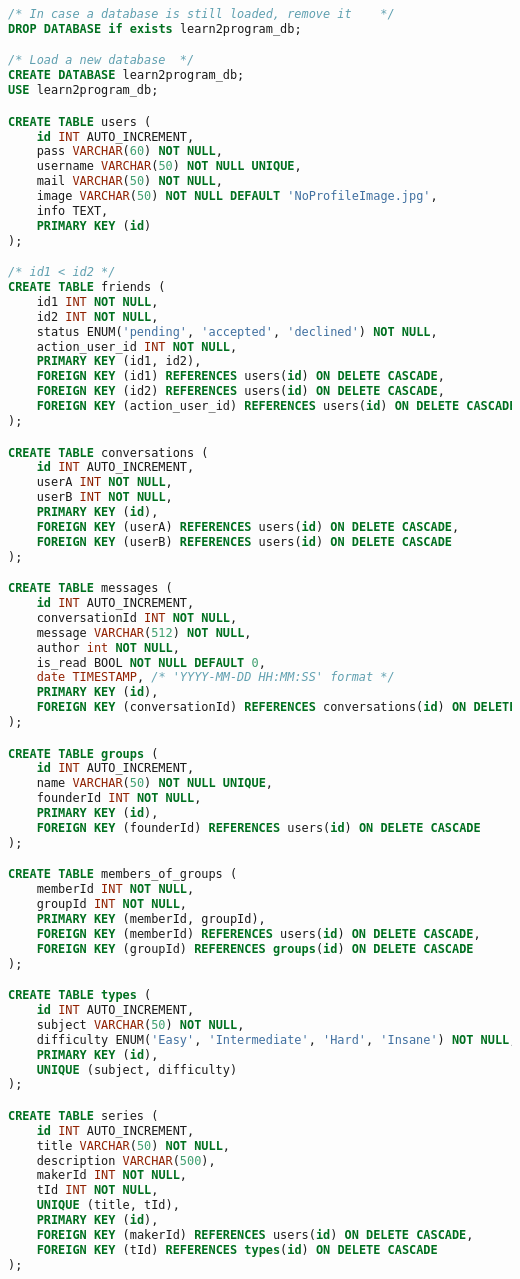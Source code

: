 \begin{lstlisting}[language=sql]
/* In case a database is still loaded, remove it    */
DROP DATABASE if exists learn2program_db;

/* Load a new database  */
CREATE DATABASE learn2program_db;
USE learn2program_db;

CREATE TABLE users (
    id INT AUTO_INCREMENT,
    pass VARCHAR(60) NOT NULL,
    username VARCHAR(50) NOT NULL UNIQUE,
    mail VARCHAR(50) NOT NULL,
    image VARCHAR(50) NOT NULL DEFAULT 'NoProfileImage.jpg', 
    info TEXT,
    PRIMARY KEY (id)
);

/* id1 < id2 */
CREATE TABLE friends (
    id1 INT NOT NULL,
    id2 INT NOT NULL,
    status ENUM('pending', 'accepted', 'declined') NOT NULL,
    action_user_id INT NOT NULL,
    PRIMARY KEY (id1, id2),
    FOREIGN KEY (id1) REFERENCES users(id) ON DELETE CASCADE,
    FOREIGN KEY (id2) REFERENCES users(id) ON DELETE CASCADE,
    FOREIGN KEY (action_user_id) REFERENCES users(id) ON DELETE CASCADE
);

CREATE TABLE conversations (
    id INT AUTO_INCREMENT,
    userA INT NOT NULL,
    userB INT NOT NULL,
    PRIMARY KEY (id),
    FOREIGN KEY (userA) REFERENCES users(id) ON DELETE CASCADE,
    FOREIGN KEY (userB) REFERENCES users(id) ON DELETE CASCADE
);

CREATE TABLE messages (
    id INT AUTO_INCREMENT,
    conversationId INT NOT NULL,
    message VARCHAR(512) NOT NULL,
    author int NOT NULL,
    is_read BOOL NOT NULL DEFAULT 0,
    date TIMESTAMP, /* 'YYYY-MM-DD HH:MM:SS' format */
    PRIMARY KEY (id),
    FOREIGN KEY (conversationId) REFERENCES conversations(id) ON DELETE CASCADE
);

CREATE TABLE groups (
    id INT AUTO_INCREMENT,
    name VARCHAR(50) NOT NULL UNIQUE,
    founderId INT NOT NULL,
    PRIMARY KEY (id),
    FOREIGN KEY (founderId) REFERENCES users(id) ON DELETE CASCADE
);

CREATE TABLE members_of_groups (
    memberId INT NOT NULL,
    groupId INT NOT NULL,
    PRIMARY KEY (memberId, groupId),
    FOREIGN KEY (memberId) REFERENCES users(id) ON DELETE CASCADE,
    FOREIGN KEY (groupId) REFERENCES groups(id) ON DELETE CASCADE
);

CREATE TABLE types (
    id INT AUTO_INCREMENT,
    subject VARCHAR(50) NOT NULL,
    difficulty ENUM('Easy', 'Intermediate', 'Hard', 'Insane') NOT NULL,
    PRIMARY KEY (id),
    UNIQUE (subject, difficulty)
);

CREATE TABLE series (
    id INT AUTO_INCREMENT,
    title VARCHAR(50) NOT NULL,
    description VARCHAR(500),
    makerId INT NOT NULL,
    tId INT NOT NULL,
    UNIQUE (title, tId),
    PRIMARY KEY (id),
    FOREIGN KEY (makerId) REFERENCES users(id) ON DELETE CASCADE,
    FOREIGN KEY (tId) REFERENCES types(id) ON DELETE CASCADE
);


\end{lstlisting}
